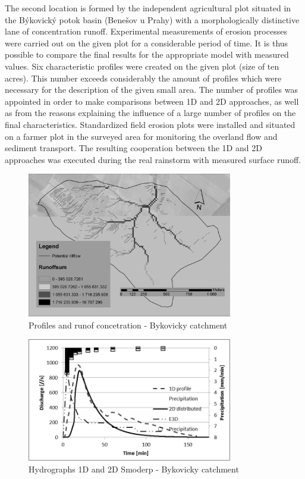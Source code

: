 The second location is formed by the independent agricultural plot situated in the Býkovický potok basin (Benešov u Prahy) with a morphologically distinctive lane of concentration runoff. Experimental measurements of erosion processes were carried out on the given plot for a considerable period of time. It is thus possible to compare the final results for the appropriate model with measured values. Six characteristic profiles were created on the given plot (size of ten acres). This number exceeds considerably the amount of profiles which were necessary for the description of the given small area. The number of profiles was appointed in order to make comparisons between 1D and 2D approaches, as well as from the reasons explaining the influence of a large number of profiles on the final characteristics. Standardized field erosion plots were installed and situated on a farmer plot in the surveyed area for monitoring the overland flow and sediment transport. The resulting cooperation between the 1D and 2D approaches was executed during the real rainstorm with measured surface runoff.

\begin{figure}[ht!]
\centering
\includegraphics[width=0.8\textwidth]{img/byk.jpg}
\caption{Profiles and runof concetration - Bykovicky catchment }
\label{fig:horany}
\end{figure}\FloatBarrier

\begin{figure}[ht!]
\renewcommand{\figurename}{Graf}
\centering
\includegraphics[width=0.8\textwidth]{graph/1D2DByk.jpg}
\caption{Hydrographs 1D and 2D Smoderp - Bykovicky catchment}
\label{graf:graf_1}
\end{figure}\FloatBarrier

